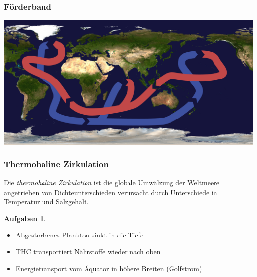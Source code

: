 %
%
%
\theoremstyle{definition}
\newtheorem{aufgaben}{Aufgaben}
\newtheorem{temperatur}{Temperaturabhängigkeit der Dichte}
\newtheorem{salinity}{Salzgehalt und Dichte}




\begin{frame}
\frametitle{Förderband}
\begin{center}
\includegraphics[width=\hsize]{Thermohaline_circulation.png}
\end{center}
\end{frame}

\begin{frame}
\frametitle{Thermohaline Zirkulation}
\begin{definition}
Die {\em thermohaline Zirkulation} ist die
globale Umwälzung der Weltmeere angetrieben von Dichteunterschieden
verursacht durch Unterschiede in Temperatur und Salzgehalt.
\end{definition}

\begin{aufgaben}
\begin{itemize}
\item Abgestorbenes Plankton sinkt in die Tiefe
\item THC transportiert Nährstoffe wieder nach oben
\item Energietransport vom Äquator in höhere Breiten
(Golfstrom)
\end{itemize}
\end{aufgaben}

\end{frame}

